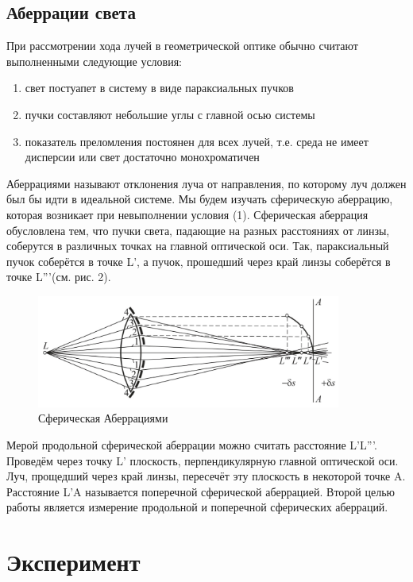 \documentclass[
11pt,%
tightenlines,%
twoside,%
onecolumn,%
nofloats,%
nobibnotes,%
nofootinbib,%
superscriptaddress,%
noshowpacs,%
centertags]%
{revtex4}
\begin{document}
\subsection{Аберрации света}
При рассмотрении хода лучей в геометрической оптике обычно считают выполненными следующие условия:
\begin{enumerate}
    \item свет постуапет в систему в виде параксиальных пучков
    \item пучки составляют небольшие углы с главной осью системы
    \item показатель преломления постоянен для всех лучей, т.е. среда не имеет дисперсии или свет достаточно монохроматичен
\end{enumerate}
Аберрациями называют отклонения луча от направления, по которому луч должен был бы идти в идеальной 
системе. Мы будем изучать сферическую аберрацию, которая возникает при невыполнении условия (1).
Сферическая аберрация обусловлена тем, что пучки света, падающие на разных расстояниях от линзы,
соберутся в различных точках на главной оптической оси. Так, параксиальный пучок соберётся в точке 
L', а пучок, прошедший через край линзы соберётся в точке L'''(см. рис. 2).
\begin{figure}[h]
    \centering
    \includegraphics[width=10cm]{Spherical_aberration.jpg}
    \caption{Сферическая Аберрациями}
    \label{fig:1}
\end{figure}
Мерой продольной сферической аберрации можно считать расстояние L'L'''. Проведём через точку L' 
плоскость, перпендикулярную главной оптической оси. Луч, прощедший через край линзы, пересечёт эту
плоскость в некоторой точке A. Расстояние L'A называется поперечной сферической аберрацией. Второй
целью работы является измерение продольной и поперечной сферических аберраций. 


\section{Эксперимент}
\end{document}
